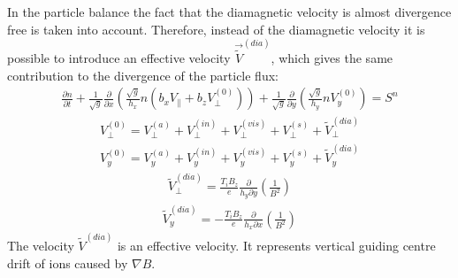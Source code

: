 \documentclass[a4paper,10pt]{report}
\begin{document}
In the particle balance
the fact that the diamagnetic
velocity is almost divergence free is taken into
account. Therefore, instead of the diamagnetic velocity
it is possible to introduce an effective
velocity $\vec{\tilde{V}}^{\left( dia \right)}$,
which gives the same contribution
to the divergence of the particle flux:
\begin{gather}
\label{eq:nf4}
\frac{\partial n}{\partial t} +
     \frac{1}{\sqrt{g}} \frac{\partial }{\partial x}
      \left(\frac{\sqrt{g}}{h_x} n\left(b_x V_{\parallel} +
     b_z V_{\perp}^{\left( 0 \right)}\right)\right)+
     \frac{1}{\sqrt{g}} \frac{\partial }{\partial y}
      \left(\frac{\sqrt{g}}{h_y} n V_y^{\left( 0 \right)}\right)
= S^n
\end{gather}
\begin{gather}\label{eq:nf5}
V_{\perp}^{\left( 0 \right)} = V_{\perp}^{\left( a \right)} +
V_{\perp}^{\left( in \right)} + V_{\perp}^{\left( vis \right)} +
V_{\perp}^{\left( s \right)} + \tilde{V}_{\perp}^{\left( dia \right)}
\end{gather}
\begin{gather}\label{eq:nf6}
V_{y}^{\left( 0 \right)} = V_{y}^{\left( a \right)} +
V_{y}^{\left( in \right)} + V_{y}^{\left( vis \right)} +
V_{y}^{\left( s \right)} + \tilde{V}_{y}^{\left( dia \right)}
\end{gather}
\begin{gather}\label{eq:nf7}
\tilde{V}_{\perp}^{\left( dia \right)} = \frac{T_i B_z}{e}
\frac{\partial}{h_y \partial y}\left(\frac{1}{B^2}\right)
\end{gather}
\begin{gather}\label{eq:nf8}
\tilde{V}_y^{\left( dia \right)} = -\frac{T_i B_z}{e}
\frac{\partial}{h_x \partial x}\left(\frac{1}{B^2}\right)
\end{gather}
The velocity $\tilde{V}^{{\left(dia\right)}}$ is an effective velocity. It
represents vertical guiding centre drift of ions caused by
$\nabla B$.\\
\end{document}
